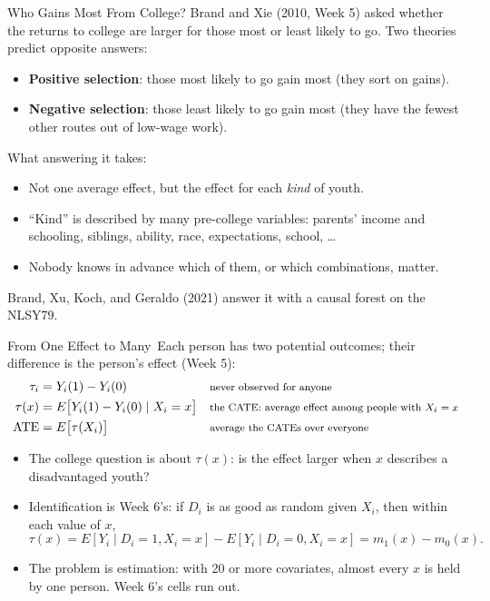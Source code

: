 \documentclass[aspectratio=169,11pt,xcolor=dvipsnames]{beamer}
\newcommand{\E}{E}
\newcommand{\core}{\,\raisebox{0.6pt}{\textcolor{corestar}{$\bigstar$}}}
\begin{document}
\begin{frame}{Who Gains Most From College?}
Brand and Xie (2010, Week 5) asked whether the returns to college are larger for those
most or least likely to go. Two theories predict opposite answers:
\begin{itemize}\itemsep3pt
  \item \textbf{Positive selection}: those most likely to go gain most (they sort on gains).
  \item \textbf{Negative selection}: those least likely to go gain most (they have the fewest
        other routes out of low-wage work).
\end{itemize}
\vskip4pt
What answering it takes:
\begin{itemize}\itemsep3pt
  \item Not one average effect, but the effect for each \emph{kind} of youth.
  \item ``Kind'' is described by many pre-college variables: parents' income and schooling,
        siblings, ability, race, expectations, school, \dots
  \item Nobody knows in advance which of them, or which combinations, matter.
\end{itemize}
\vskip4pt
{\small Brand, Xu, Koch, and Geraldo (2021) answer it with a causal forest on the NLSY79.}
\end{frame}

\begin{frame}{From One Effect to Many\core}
Each person has two potential outcomes; their difference is the person's effect (Week 5):
\begin{align*}
  \tau_i &= Y_i(1) - Y_i(0)
   && \text{\footnotesize never observed for anyone} \\
  \tau(x) &= \E\big[Y_i(1) - Y_i(0) \mid X_i = x\big]
   && \text{\footnotesize the CATE: average effect among people with $X_i = x$} \\
  \text{ATE} &= \E\big[\tau(X_i)\big]
   && \text{\footnotesize average the CATEs over everyone}
\end{align*}
\vskip-2pt
\begin{itemize}\itemsep3pt
  \item The college question is about $\tau(x)$: is the effect larger when $x$ describes a
        disadvantaged youth?
  \item Identification is Week 6's: if $D_i$ is as good as random given $X_i$, then
        within each value of $x$,
  \[
    \tau(x) = \E[Y_i \mid D_i = 1, X_i = x] - \E[Y_i \mid D_i = 0, X_i = x] = m_1(x) - m_0(x).
  \]
  \item The problem is estimation: with 20 or more covariates, almost every $x$ is held by one
        person. Week 6's cells run out.
\end{itemize}
\end{frame}
\end{document}

